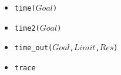 \documentclass[10pt]{article}
\begin{document}
\begin{multicols}{2}
\begin{scriptsize}
\begin{itemize}
    \item \texttt{time($Goal$)}
    \item \texttt{time2($Goal$)} 
    \item \texttt{time\_out($Goal$,$Limit$,$Res$)}
    \item \texttt{trace}
\end{itemize}
\end{scriptsize}


\end{multicols}
\end{document}
